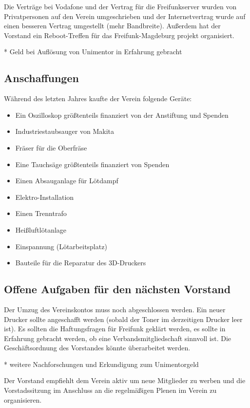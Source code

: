 \documentclass[a4paper,12pt,titlepage]{scrartcl}
\begin{document}
Die Verträge bei Vodafone und der Vertrag für die Freifunkserver wurden von Privatpersonen auf den Verein umgeschrieben und der Internetvertrag wurde auf einen besseren Vertrag umgestellt (mehr Bandbreite). Außerdem hat der Vorstand ein Reboot-Treffen für das Freifunk-Magdeburg projekt organisiert.

    * Geld bei Auflösung von Unimentor in Erfahrung gebracht

\subsection{Anschaffungen}

Während des letzten Jahres kaufte der Verein folgende Geräte:
\begin{itemize}
	\item Ein Oszilloskop größtenteils finanziert von der Anstiftung und Spenden
	\item Industriestaubsauger von Makita
	\item Fräser für die Oberfräse
	\item Eine Tauchsäge größtenteils finanziert von Spenden
	\item Einen Absauganlage für Lötdampf
	\item Elektro-Installation
	\item Einen Trenntrafo
	\item Heißluftlötanlage
	\item Einspannung (Lötarbeitsplatz)
	\item Bauteile für die Reparatur des 3D-Druckers
\end{itemize}

\subsection{Offene Aufgaben für den nächsten Vorstand}

Der Umzug des Vereinskontos muss noch abgeschlossen werden. Ein neuer Drucker
sollte angeschafft werden (sobald der Toner im derzeitigen Drucker leer ist).
Es sollten die Haftungsfragen für Freifunk geklärt werden, es sollte in Erfahrung gebracht werden, ob eine Verbandsmitgliedschaft sinnvoll ist.
Die Geschäftsordnung des Vorstandes könnte überarbeitet werden.

* weitere Nachforschungen und Erkundigung zum Unimentorgeld

Der Vorstand empfiehlt dem Verein aktiv um neue Mitglieder zu werben und die Vorstadssitzung im Anschluss an die regelmäßigen Plenen im Verein zu organisieren.
\end{document}
